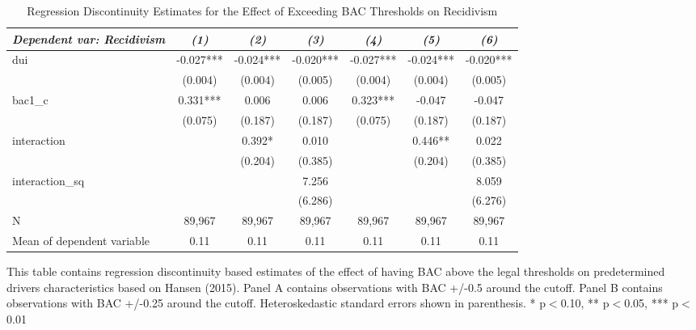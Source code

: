 \begin{table}[htbp]\centering
\small
\caption{Regression Discontinuity Estimates for the Effect of Exceeding BAC Thresholds on Recidivism}
\begin{center}
\begin{threeparttable}
\begin{tabular}{l*{6}{c}}
\toprule
\multicolumn{1}{l}{\textit{Dependent var: Recidivism }}&
\multicolumn{1}{c}{\textit{(1)}}&
\multicolumn{1}{c}{\textit{(2)}}&
\multicolumn{1}{c}{\textit{(3)}}&
\multicolumn{1}{c}{\textit{(4)}}&
\multicolumn{1}{c}{\textit{(5)}}&
\multicolumn{1}{c}{\textit{(6)}}\\
\midrule
dui                 &      -0.027***&      -0.024***&      -0.020***&      -0.027***&      -0.024***&      -0.020***\\
                    &     (0.004)   &     (0.004)   &     (0.005)   &     (0.004)   &     (0.004)   &     (0.005)   \\
bac1\_c              &       0.331***&       0.006   &       0.006   &       0.323***&      -0.047   &      -0.047   \\
                    &     (0.075)   &     (0.187)   &     (0.187)   &     (0.075)   &     (0.187)   &     (0.187)   \\
interaction         &               &       0.392*  &       0.010   &               &       0.446** &       0.022   \\
                    &               &     (0.204)   &     (0.385)   &               &     (0.204)   &     (0.385)   \\
interaction\_sq      &               &               &       7.256   &               &               &       8.059   \\
                    &               &               &     (6.286)   &               &               &     (6.276)   \\
\midrule
N                   &      89,967   &      89,967   &      89,967   &      89,967   &      89,967   &      89,967   \\
Mean of dependent variable&        0.11   &        0.11   &        0.11   &        0.11   &        0.11   &        0.11   \\
\bottomrule
\end{tabular}
\begin{tablenotes}
\tiny
\item This table contains regression discontinuity based estimates of the effect of having BAC above the legal thresholds on predetermined  drivers characteristics based on Hansen (2015). Panel A contains observations with BAC +/-0.5 around the cutoff. Panel B contains observations with BAC +/-0.25 around the cutoff.   Heteroskedastic standard errors shown in parenthesis.  * p$<$0.10, ** p$<$0.05, *** p$<$0.01
\end{tablenotes}
\end{threeparttable}
\end{center}
\end{table}
